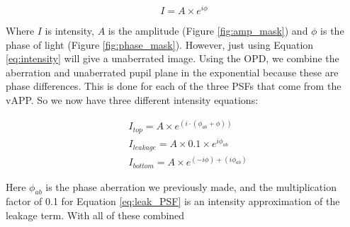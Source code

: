\begin{equation}
    I = A \times e^{i \phi}
    \label{eq:intensity}
\end{equation}

Where $I$ is intensity, $A$ is the amplitude (Figure \ref{fig:amp_mask}) and $\phi$ is the phase of light (Figure \ref{fig:phase_mask}).  However, just using Equation \ref{eq:intensity} will give a unaberrated image.  Using the OPD, we combine the aberration and unaberrated pupil plane in the exponential because these are phase differences.  This is done for each of the three PSFs that come from the vAPP.  So we now have three different intensity equations:

\begin{align}
    & I_{top} = A \times e^{(i \cdot (\phi_{ab} + \phi))} \label{eq:top_PSF} \\
    & I_{leakage} = A \times 0.1 \times e^{i \phi_{ab}} \label{eq:leak_PSF} \\
    & I_{bottom} = A \times e^{(-i \phi) + (i \phi_{ab})} \label{eq:bottom_PSF}
\end{align}

Here $\phi_{ab}$ is the phase aberration we previously made, and the multiplication factor of 0.1 for Equation \ref{eq:leak_PSF} is an intensity approximation of the leakage term.  With all of these combined

